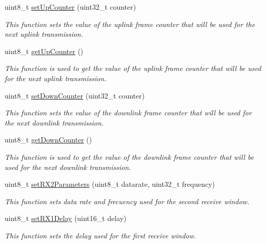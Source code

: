 \begin{DoxyCompactItemize}
uint8\+\_\+t \hyperlink{class_wasp_lo_ra_w_a_n_a973b8e71957ff75158d4e648633ebf6e}{set\+Up\+Counter} (uint32\+\_\+t counter)
\begin{DoxyCompactList}\small\item\em This function sets the value of the uplink frame counter that will be used for the next uplink transmission. \end{DoxyCompactList}\item 
uint8\+\_\+t \hyperlink{class_wasp_lo_ra_w_a_n_a584ed69c7e3604d86315ab94b5609cf0}{get\+Up\+Counter} ()
\begin{DoxyCompactList}\small\item\em This function is used to get the value of the uplink frame counter that will be used for the next uplink transmission. \end{DoxyCompactList}\item 
uint8\+\_\+t \hyperlink{class_wasp_lo_ra_w_a_n_a585f169558b604d4b2d3bfbbef690acc}{set\+Down\+Counter} (uint32\+\_\+t counter)
\begin{DoxyCompactList}\small\item\em This function sets the value of the downlink frame counter that will be used for the next downlink transmission. \end{DoxyCompactList}\item 
uint8\+\_\+t \hyperlink{class_wasp_lo_ra_w_a_n_af5392fe747fb14e5ee0e68a7ee6613e5}{get\+Down\+Counter} ()
\begin{DoxyCompactList}\small\item\em This function is used to get the value of the downlink frame counter that will be used for the next downlink transmission. \end{DoxyCompactList}\item 
uint8\+\_\+t \hyperlink{class_wasp_lo_ra_w_a_n_afe89905f87186beeb698203a281c0040}{set\+R\+X2\+Parameters} (uint8\+\_\+t datarate, uint32\+\_\+t frequency)
\begin{DoxyCompactList}\small\item\em This function sets data rate and frecuency used for the second receive window. \end{DoxyCompactList}\item 
uint8\+\_\+t \hyperlink{class_wasp_lo_ra_w_a_n_a665d79a3bf34db15e8d5f41bd0093f19}{set\+R\+X1\+Delay} (uint16\+\_\+t delay)
\begin{DoxyCompactList}\small\item\em This function sets the delay used for the first receive window. \end{DoxyCompactList}\item 

\end{DoxyCompactItemize}
